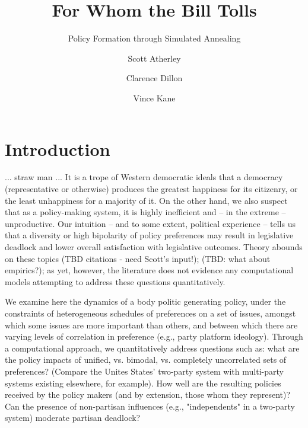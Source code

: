 \documentclass[pdftex,12pt]{llncs}
\begin{document}
\title{For Whom the Bill Tolls}
\subtitle{Policy Formation through Simulated Annealing }
\author{Scott Atherley \and Clarence Dillon \and Vince Kane}
\maketitle
%
%
\section{Introduction}
... straw man ...
It is a trope of Western democratic ideals that a democracy (representative or otherwise) produces the greatest happiness for its citizenry, or the least unhappiness for a majority of it.
On the other hand, we also suspect that as a policy-making system, it is highly inefficient and -- in the extreme -- unproductive.
Our intuition -- and to some extent, political experience -- tells us that a diversity or high bipolarity of policy preferences may result in legislative deadlock and lower overall satisfaction with legislative outcomes.
Theory abounds on these topics (TBD citations - need Scott's input!); (TBD: what about empirics?); as yet, however, the literature does not evidence any computational models attempting to address these questions quantitatively.

We examine here the dynamics of a body politic generating policy, under the constraints of heterogeneous schedules of preferences on a set of issues, amongst which some issues are more important than others, and between which there are varying levels of correlation in preference (e.g., party platform ideology).
Through a computational approach, we quantitatively address questions such as: what are the policy impacts of unified, vs. bimodal, vs. completely uncorrelated sets of preferences?
(Compare the Unites States' two-party system with multi-party systems existing elsewhere, for example).
How well are the resulting policies received by the policy makers (and by extension, those whom they represent)?
Can the presence of non-partisan influences (e.g., "independents" in a two-party system) moderate partisan deadlock?
\end{document}
